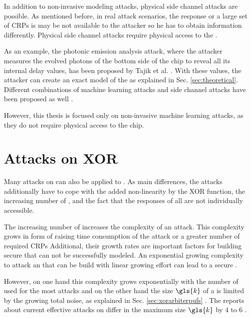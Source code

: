 In addition to non-invasive modeling attacks, physical side channel attacks are possible.
As mentioned before, in real attack scenarios, the \puf response or a large set of \acp{CRP} is may be not available to the attacker so he has to obtain information differently.
Physical side channel attacks require physical access to the \puf. %

As an example, the photonic emission analysis attack, where the attacker measures the evolved photons of the bottom side of the \apuf chip to reveal all its internal delay values, has been proposed by Tajik et al. \cite{Tajik2014PhysicalPUFs}.
With these values, the attacker can create an exact model of the \apuf as explained in Sec. \ref{sec:theoretical}. %
Different combinations of machine learning attacks and side channel attacks have been proposed as well \cite{Mahmoud2013CombinedPUFs, Xu2014Hybrid}.

However, this thesis is focused only on non-invasive machine learning attacks, as they do not require physical access to the \apuf chip.


\section{Attacks on \acs{XOR} \apufs}
\label{sec:attacksonxorarbiter}

Many attacks on \apufs can also be applied to \xpufs.
As main differences, the attacks additionally have to cope with the added non-linearity by the \ac{XOR} function, the increasing number of \apufs, and the fact that the responses of all \apufs are not individually accessible.

The increasing number of \apufs increases the complexity of an attack.
This complexity grows in form of raising time consumption of the attack or a greater number of required \acp{CRP}
Additional, their growth rates are important factors for building secure \xpufs that can not be successfully modeled.
An exponential growing complexity to attack an \xpuf that can be build with linear growing effort can lead to a secure \puf.

However, on one hand this complexity grows exponentially with the number of used \apufs for the most attacks and on the other hand the size $\gls{k}$ of a \xpuf is limited by the growing total noise, as explained in Sec. \ref{sec:xorarbiterpufs} \cite{Ruhrmair2010ModelingFunctions}. %
The reports about current effective attacks on \xpufs differ in the maximum size $\gls{k}$ by $4$ to $6$ \cite{Ganji2015WhyPUFs, Xu2014Hybrid}.

